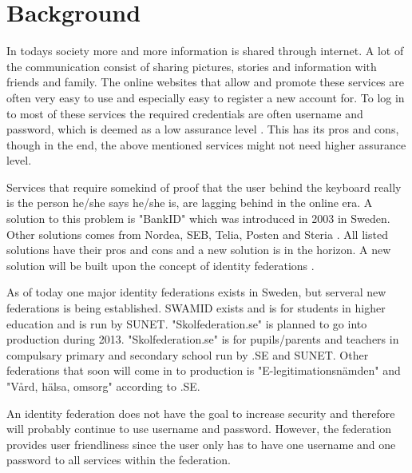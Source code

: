 \section{Background}
In todays society more and more information is shared through internet.
A lot of the communication consist of sharing pictures, stories and information with friends and family.
The online websites that allow and promote these services are often very easy to use and especially easy to register a new account for.
To log in to most of these services the required credentials are often username and password, which is deemed as a low assurance level \cite[p.~244]{pdf:SOU}.
This has its pros and cons, though in the end, the above mentioned services might not need higher assurance level.

Services that require somekind of proof that the user behind the keyboard really is the person he/she says he/she is, are lagging behind in the online era.
A solution to this problem is "BankID" which was introduced in 2003 \cite{website:bankid-about} in Sweden.
Other solutions comes from Nordea, SEB, Telia, Posten and Steria \cite[p.~256]{pdf:SOU}.
All listed solutions have their pros and cons and a new solution is in the horizon.
A new solution will be built upon the concept of identity federations \cite[p.~23]{pdf:SOU}.

As of today one major identity federations exists in Sweden, but serveral new federations is being established.
SWAMID exists and is for students in higher education and is run by SUNET. 
"Skolfederation.se" is planned to go into production during 2013.
"Skolfederation.se" is for pupils/parents and teachers in compulsary primary and secondary school run by .SE and SUNET. 
Other federations that soon will come in to production is "E-legitimationsn{\"a}mden" and "V\r{a}rd, h{\"a}lsa, omsorg" according to .SE.  

An identity federation does not have the goal to increase security and therefore will probably continue to use username and password. 
However, the federation provides user friendliness since the user only has to have one username and one password to all services within the federation. 



